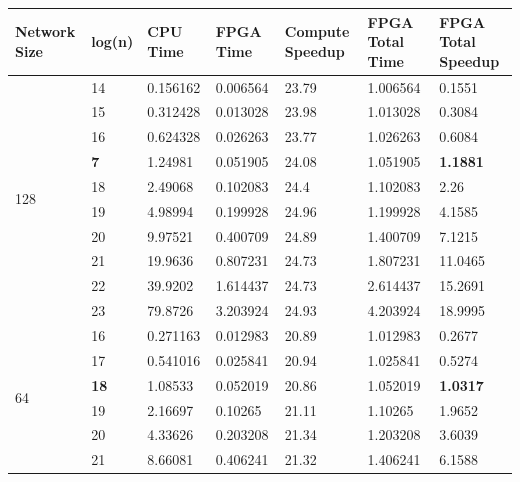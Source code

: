 \begin{table}
  \begin{tabularx}{\textwidth}{X|X|X|X|X|X|X}
    \hline
    Network Size        & log(n)      & CPU Time & FPGA Time & Compute Speedup & FPGA Total Time & FPGA Total Speedup \\
    \hline \hline
    \multirow{10}{*}{128}   & 14          & 0.156162 & 0.006564  & 23.79           & 1.006564        & 0.1551             \\
    & 15          & 0.312428 & 0.013028  & 23.98           & 1.013028        & 0.3084             \\
    & 16          & 0.624328 & 0.026263  & 23.77           & 1.026263        & 0.6084             \\
    & \textbf{7}  & 1.24981  & 0.051905  & 24.08           & 1.051905        & \textbf{1.1881}    \\
    & 18          & 2.49068  & 0.102083  & 24.4            & 1.102083        & 2.26               \\
    & 19          & 4.98994  & 0.199928  & 24.96           & 1.199928        & 4.1585             \\
    & 20          & 9.97521  & 0.400709  & 24.89           & 1.400709        & 7.1215             \\
    & 21          & 19.9636  & 0.807231  & 24.73           & 1.807231        & 11.0465            \\
    & 22          & 39.9202  & 1.614437  & 24.73           & 2.614437        & 15.2691            \\
    & 23          & 79.8726  & 3.203924  & 24.93           & 4.203924        & 18.9995            \\
    \hline
    \multirow{8}{*}{64} & 16          & 0.271163 & 0.012983  & 20.89           & 1.012983        & 0.2677             \\
    & 17          & 0.541016 & 0.025841  & 20.94           & 1.025841        & 0.5274             \\
    & \textbf{18} & 1.08533  & 0.052019  & 20.86           & 1.052019        & \textbf{1.0317}    \\
    & 19          & 2.16697  & 0.10265   & 21.11           & 1.10265         & 1.9652             \\
    & 20          & 4.33626  & 0.203208  & 21.34           & 1.203208        & 3.6039             \\
    & 21          & 8.66081  & 0.406241  & 21.32           & 1.406241        & 6.1588             \\

\end{tabularx}
\end{table}
